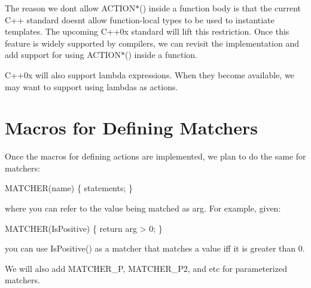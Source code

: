 The reason we don\textquotesingle{}t allow {\ttfamily A\+C\+T\+I\+O\+N$\ast$()} inside a function body is that the current C++ standard doesn\textquotesingle{}t allow function-\/local types to be used to instantiate templates. The upcoming C++0x standard will lift this restriction. Once this feature is widely supported by compilers, we can revisit the implementation and add support for using {\ttfamily A\+C\+T\+I\+O\+N$\ast$()} inside a function.

C++0x will also support lambda expressions. When they become available, we may want to support using lambdas as actions.

\section*{Macros for Defining Matchers}

Once the macros for defining actions are implemented, we plan to do the same for matchers\+:


\begin{DoxyCode}
MATCHER(name) \{ statements; \}
\end{DoxyCode}


where you can refer to the value being matched as {\ttfamily arg}. For example, given\+:


\begin{DoxyCode}
MATCHER(IsPositive) \{ return arg > 0; \}
\end{DoxyCode}


you can use {\ttfamily Is\+Positive()} as a matcher that matches a value iff it is greater than 0.

We will also add {\ttfamily M\+A\+T\+C\+H\+E\+R\+\_\+P}, {\ttfamily M\+A\+T\+C\+H\+E\+R\+\_\+\+P2}, and etc for parameterized matchers. 